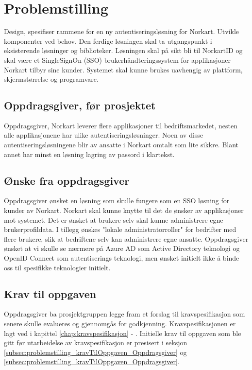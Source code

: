 \chapter{Problemstilling}
\label{chap:problemstilling}
Design, spesifiser rammene for en ny autentiseringsløsning
for Norkart. Utvikle komponenter ved behov. Den ferdige løsningen skal ta utgangspunkt i eksisterende løsninger og biblioteker. Løsningen skal på sikt bli til NorkartID og skal være et SingleSignOn (SSO) brukerhåndteringssystem for applikasjoner Norkart tilbyr sine kunder. Systemet skal kunne brukes uavhengig av plattform, skjermstørrelse og programvare.

\section{Oppdragsgiver, før prosjektet}
\label{sec:problemstilling_oppdragsgiverFørProsjektet}
Oppdragsgiver, Norkart leverer flere applikasjoner til bedriftsmarkedet, nesten alle applikasjonene har ulike autentiseringsløsninger. Noen av disse autentiseringsløsningene blir av ansatte i Norkart omtalt som lite sikkre. Blant annet har minst en løsning lagring av passord i klartekst. 

\section{Ønske fra oppdragsgiver}
\label{sec:problemstiling_ønskeFraOppdragsgiver}
Oppdragsgiver ønsket en løsning som skulle fungere som en SSO løsning for kunder av Norkart. Norkart skal kunne knytte til det de ønsker av applikasjoner mot systemet. Det er ønsket at brukere selv skal kunne administrere egne brukerprofildata. I tillegg ønskes "lokale administratorroller" for bedrifter med flere brukere, slik at bedriftene selv kan administrere egne ansatte. 
\bigskip
Oppdragsgiver ønsket at vi skulle se nærmere på Azure AD som Active Directory teknologi og OpenID Connect som autentiserings teknologi, men ønsket initielt ikke å binde oss til spesifikke teknologier initielt.

\section{Krav til oppgaven}
\label{sec:problemstilling_kravTilOppgaven}
Oppdragsgiver ba prosjektgruppen legge fram et forslag til kravspesifikasjon som senere skulle evalueres og gjennomgås for godkjenning. Kravspesifikasjonen er lagt ved i kapittel \ref{chap:kravspesifikasjon} - . Initielle krav til oppgaven som ble gitt før utarbeidelse av kravspesifikasjon er presisert i seksjon \ref{subsec:problemstilling_kravTilOppgaven_Oppdragsgiver} og \ref{subsec:problemstilling_kravTilOppgaven_Oppdragsgiver}.

